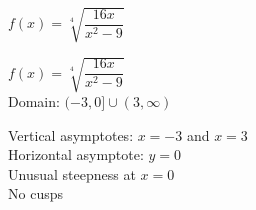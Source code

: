 {$f(x) = \sqrt[4]{\dfrac{16x}{x^{2} - 9}}$}
{$f(x) = \sqrt[4]{\dfrac{16x}{x^2 - 9}}$\\
Domain: $(-3, 0] \cup (3, \infty)$\\
\begin{center}
\end{center}

Vertical asymptotes: $x = -3$ and $x = 3$\\
Horizontal asymptote: $y = 0$\\
Unusual steepness at $x = 0$\\
No cusps\\


\begin{center}
\end{center}}


